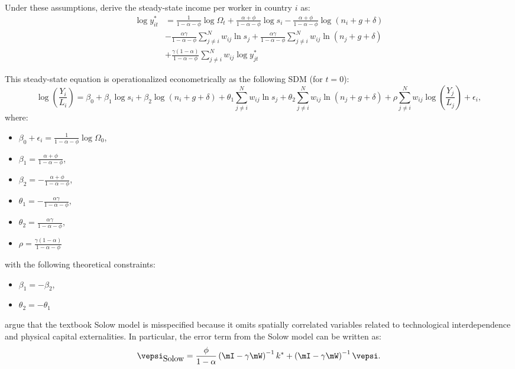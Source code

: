 \documentclass[english,12pt]{book}\usepackage[]{graphicx}\usepackage[]{xcolor}
\begin{document}
Under these assumptions, \cite{ertur2007growth} derive the steady-state income per worker in country $i$ as:
\begin{equation*}
  \begin{aligned}
    \log y_{it}^* & =  \frac{1}{1 - \alpha -\phi}\log \Omega_t + \frac{\alpha + \phi}{1 - \alpha -\phi}\log s_i - \frac{\alpha + \phi}{1 - \alpha -\phi}\log (n_i + g + \delta) \\
                  & - \frac{\alpha\gamma}{1 - \alpha -\phi}\sum_{j\neq i}^N w_{ij}\ln s_j + \frac{\alpha\gamma}{1 - \alpha -\phi}\sum_{j\neq i}^N w_{ij}\ln(n_j + g + \delta) \\
                  & + \frac{\gamma(1 - \alpha)}{1 - \alpha -\phi}\sum_{j\neq i}^N w_{ij}\log y_{jt}^*
  \end{aligned}
\end{equation*}

This steady-state equation is operationalized econometrically as the following SDM (for $t=0$):
\begin{equation*}
    \log \left(\frac{Y_i}{L_i}\right) =  \beta_0 + \beta_1\log s_i + \beta_2 \log (n_i + g + \delta) 
                   + \theta_1 \sum_{j\neq i}^N w_{ij}\ln s_j + \theta_2\sum_{j\neq i}^N w_{ij}\ln(n_j + g + \delta) 
                   + \rho \sum_{j\neq i}^N w_{ij}\log \left(\frac{Y_j}{L_j}\right) + \epsilon_i,
\end{equation*}
%
where:
\begin{itemize}
  \item $\beta_0 + \epsilon_i = \frac{1}{1 - \alpha -\phi}\log \Omega_0$, 
  \item $\beta_1 = \frac{\alpha + \phi}{1 - \alpha -\phi}$,
  \item $\beta_2 = - \frac{\alpha + \phi}{1 - \alpha -\phi}$,
  \item $\theta_1 = - \frac{\alpha\gamma}{1 - \alpha -\phi}$,
  \item $\theta_2 = \frac{\alpha\gamma}{1 - \alpha -\phi}$,
   \item $\rho = \frac{\gamma(1 - \alpha)}{1 - \alpha -\phi}$
\end{itemize}
%
with the following theoretical constraints: 
\begin{itemize}
  \item $\beta_1 = - \beta_2$,
  \item $\theta_2 = -\theta_1$
\end{itemize}

\cite{ertur2007growth} argue that the textbook Solow model is misspecified because it omits spatially correlated variables related to technological interdependence and physical capital externalities. In particular, the error term from the Solow model can be written as:
\begin{equation*}
  \vepsi_{\mbox{Solow}} = \frac{\phi}{1 - \alpha}\left(\mI - \gamma\mW\right)^{-1}k^{*} + \left(\mI - \gamma\mW\right)^{-1}\vepsi.
\end{equation*}
\end{document}
